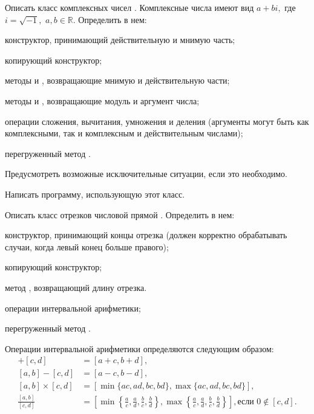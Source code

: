 \task Описать класс комплексных чисел . Комплексные числа
имеют вид $a+bi,$ где $i=\sqrt{-1},$ $a,b \in \mathbb{R}$. Определить
в нем:
\begin{itemize*}
\item конструктор, принимающий действительную и мнимую часть;
\item копирующий конструктор;
\item методы  и , возвращающие мнимую и действительную
  части;
\item методы  и , возвращающие модуль и аргумент
  числа;
\item операции сложения, вычитания, умножения и деления (аргументы
  могут быть как комплексными, так и комплексным и действительным
  числами);
\item перегруженный метод .
\end{itemize*}

Предусмотреть возможные исключительные ситуации, если это необходимо.

Написать программу, использующую этот класс.

\task Описать класс отрезков числовой прямой
. Определить в нем:
\begin{itemize*}
\item конструктор, принимающий концы отрезка (должен корректно
  обрабатывать случаи, когда левый конец больше правого);
\item копирующий конструктор;
\item метод , возвращающий длину отрезка.
\item операции интервальной арифметики;
\item перегруженный метод .
\end{itemize*}

Операции интервальной арифметики определяются следующим образом:
\begin{align*}
  [a, b] + [c, d] &= [a + c, b + d],\\
  [a, b] - [c, d] &= [a - c, b - d],\\
  [a, b] \times [c, d] &=
  [\min \{ac, ad, bc, bd\}, \max \{ac, ad, bc, bd\}],\\
  \frac{[a, b]}{[c, d]} &=
  \left[
    \min \left\{\frac{a}{c}, \frac{a}{d}, \frac{b}{c}, \frac{b}{d}\right\},
    \max \left\{\frac{a}{c}, \frac{a}{d}, \frac{b}{c}, \frac{b}{d}\right\}
    \right], \textrm{если } 0\not\in[c, d].
\end{align*}

